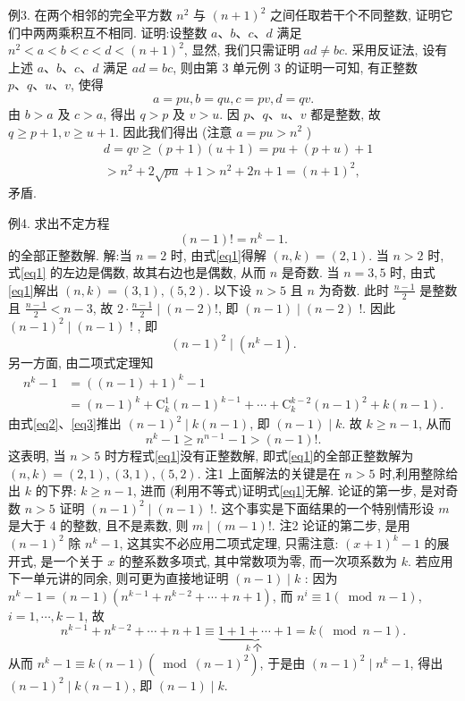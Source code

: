 例3. 在两个相邻的完全平方数 $n^2$ 与 $(n+1)^2$ 之间任取若干个不同整数, 证明它们中两两乘积互不相同.
证明:设整数 $a 、 b 、 c 、 d$ 满足 $n^2<a<b<c<d<(n+1)^2$, 显然, 我们只需证明 $a d \neq b c$. 采用反证法, 设有上述 $a 、 b 、 c 、 d$ 满足 $a d=b c$, 则由第 3 单元例 3 的证明一可知, 有正整数 $p 、 q 、 u 、 v$, 使得
$$
a=p u, b=q u, c=p v, d=q v .
$$
由 $b>a$ 及 $c>a$, 得出 $q>p$ 及 $v>u$. 因 $p 、 q 、 u 、 v$ 都是整数, 故 $q \geqslant p+1, v \geqslant u+1$. 因此我们得出 (注意 $a=p u>n^2$ )
$$
\begin{aligned}
& d=q v \geqslant(p+1)(u+1)=p u+(p+u)+1 \\
& >n^2+2 \sqrt{p u}+1>n^2+2 n+1=(n+1)^2,
\end{aligned}
$$
矛盾.



例4. 求出不定方程
$$
(n-1) !=n^k-1 . \label{eq1}
$$
的全部正整数解.
解:当 $n=2$ 时, 由式\ref{eq1}得解 $(n, k)=(2,1)$. 当 $n>2$ 时, 式\ref{eq1} 的左边是偶数, 故其右边也是偶数, 从而 $n$ 是奇数.
当 $n=3,5$ 时, 由式\ref{eq1}解出 $(n, k)=(3,1), (5,2)$.
以下设 $n>5$ 且 $n$ 为奇数.
此时 $\frac{n-1}{2}$ 是整数且 $\frac{n-1}{2}<n-3$, 故 $2 \cdot \frac{n-1}{2} \mid(n-2) !$, 即 $(n-1) \mid(n-2)$ !. 因此 $(n-1)^2 \mid(n-1)$ ! , 即
$$
(n-1)^2 \mid\left(n^k-1\right) . \label{eq2}
$$
另一方面, 由二项式定理知
$$
\begin{aligned}
n^k-1 & =((n-1)+1)^k-1 \\
& =(n-1)^k+\mathrm{C}_k^1(n-1)^{k-1}+\cdots+\mathrm{C}_k^{k-2}(n-1)^2+k(n-1) . \label{eq3}
\end{aligned}
$$
由式\ref{eq2}、\ref{eq3}推出 $(n-1)^2 \mid k(n-1)$, 即 $(n-1) \mid k$. 故 $k \geqslant n-1$, 从而
$$
n^k-1 \geqslant n^{n-1}-1>(n-1) ! .
$$
这表明, 当 $n>5$ 时方程式\ref{eq1}没有正整数解, 即式\ref{eq1}的全部正整数解为 $(n, k)= (2,1),(3,1),(5,2)$.
注1 上面解法的关键是在 $n>5$ 时,利用整除给出 $k$ 的下界: $k \geqslant n-1$, 进而 (利用不等式)证明式\ref{eq1}无解.
论证的第一步, 是对奇数 $n>5$ 证明 $(n-1)^2 \mid (n-1)$ !. 这个事实是下面结果的一个特别情形设 $m$ 是大于 4 的整数, 且不是素数, 则 $m \mid(m-1) !$. 
注2 论证的第二步, 是用 $(n-1)^2$ 除 $n^k-1$, 这其实不必应用二项式定理, 只需注意: $(x+1)^k-1$ 的展开式, 是一个关于 $x$ 的整系数多项式, 其中常数项为零, 而一次项系数为 $k$.
若应用下一单元讲的同余, 则可更为直接地证明 $(n-1) \mid k$ :
因为 $n^k-1=(n-1)\left(n^{k-1}+n^{k-2}+\cdots+n+1\right)$, 而 $n^i \equiv 1(\bmod n-1)$, $i=1, \cdots, k-1$, 故
$$
n^{k-1}+n^{k-2}+\cdots+n+1 \equiv \underbrace{1+1+\cdots+1}_{k \text { 个 }}=k(\bmod n-1) .
$$
从而 $n^k-1 \equiv k(n-1)\left(\bmod (n-1)^2\right)$, 于是由 $(n-1)^2 \mid n^k-1$, 得出 $(n-1)^2 \mid k(n-1)$, 即 $(n-1) \mid k$.



